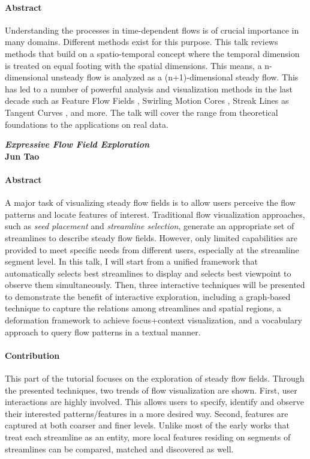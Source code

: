 \documentclass[preprint,journal]{vgtc}       %
\newcommand{\addverticalspace}{\vspace{3mm}}
\begin{document}
\paragraph{Abstract}
Understanding the processes in time-dependent flows is of crucial importance in many domains. Different methods exist for this purpose. This talk reviews methods that build on a spatio-temporal concept where the temporal dimension is treated on equal footing with the spatial dimensions. This means, a n-dimensional unsteady flow is analyzed as a (n+1)-dimensional steady flow. This has led to a number of powerful analysis and visualization methods in the last decade such as Feature Flow Fields \cite{theisel03b, weinkauf11b}, Swirling Motion Cores \cite{weinkauf07c}, Streak Lines as Tangent Curves \cite{weinkauf10c, weinkauf12a}, and more. The talk will cover the range from theoretical foundations to the applications on real data.

\addverticalspace

\noindent\textbf{\textit{Expressive Flow Field Exploration}}\\
\textbf{Jun Tao}
\paragraph{Abstract}
A major task of visualizing steady flow fields is to allow users perceive the flow patterns and locate features of interest. Traditional flow visualization approaches, such as \emph{seed placement} and \emph{streamline selection}, generate an appropriate set of streamlines to describe steady flow fields. However, only limited capabilities are provided to meet specific needs from different users, especially at the streamline segment level. In this talk, I will start from a unified framework that automatically selects best streamlines to display and selects best viewpoint to observe them simultaneously. Then, three interactive techniques will be presented to demonstrate the benefit of interactive exploration, including a graph-based technique to capture the relations among streamlines and spatial regions, a deformation framework to achieve focus+context visualization, and a vocabulary approach to query flow patterns in a textual manner.

\paragraph{Contribution}
This part of the tutorial focuses on the exploration of steady flow fields. Through the presented techniques, two trends of flow visualization are shown. First, user interactions are highly involved. This allows users to specify, identify and observe their interested patterns/features in a more desired way. Second, features are captured at both coarser and finer levels. Unlike most of the early works that treat each streamline as an entity, more local features residing on segments of streamlines can be compared, matched and discovered as well.
\end{document}
